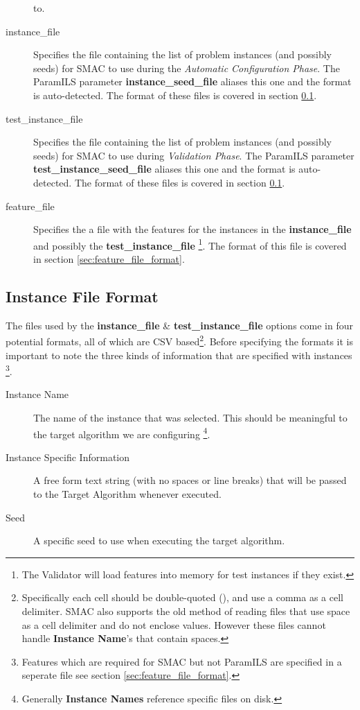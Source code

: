 \documentclass[manual.tex]{subfiles}
\begin{document}
\begin{description}
to. 
\item [{instance\_file}] Specifies the file containing the list of problem instances (and possibly seeds) for SMAC to use during the \emph{Automatic Configuration Phase}. The ParamILS parameter \textbf{instance\_seed\_file} aliases this one and the format is auto-detected. The format of these files is covered in section \ref{sec:instance_file_format}.
\item [{test\_instance\_file}] Specifies the file containing the list of problem instances (and possibly seeds) for SMAC to use during \emph{Validation Phase}. The ParamILS parameter \textbf{test\_instance\_seed\_file} aliases this one and the format is auto-detected. The format of these files is covered in section \ref{sec:instance_file_format}.
\item [{feature\_file}] Specifies the a file with the features for the instances in the \textbf{instance\_file} and possibly the \textbf{test\_instance\_file} \footnote{The Validator will load features into memory for test instances if they exist.}. The format of this file is covered in section \ref{sec:feature_file_format}.

\end{description}

\subsection{Instance File Format} \label{sec:instance_file_format}


The files used by the \textbf{instance\_file} \& \textbf{test\_instance\_file} options 
come in four potential formats, all of which are CSV based\footnote{Specifically each cell should be double-quoted (), and use a comma as a cell delimiter. SMAC also supports the old method of reading files that use space as a cell delimiter and do not enclose values. However these files cannot handle \textbf{Instance Name}'s that contain spaces.}. Before specifying the formats it is important to note the three kinds of information that are specified with instances \footnote{Features which are required for SMAC but not ParamILS are specified in a seperate file see section \ref{sec:feature_file_format}.}.

\begin{description}
\item[Instance Name] The name of the instance that was selected. This should be meaningful to the target algorithm we are configuring \footnote{Generally \textbf{Instance Names} reference specific files on disk.}.
\item[Instance Specific Information] A free form text string (with no spaces or line breaks) that will be passed to the Target Algorithm whenever executed.
\item[Seed] A specific seed to use when executing the target algorithm.
\end{description}
\end{document}
